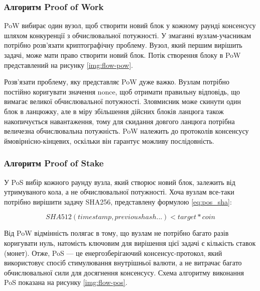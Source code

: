 \documentclass{lib/styles/default-style}
\begin{document}
    \subsubsection{Алгоритм Proof of Work}

    PoW вибирає один вузол, щоб створити новий блок у кожному раунді консенсусу шляхом конкуренції з
    обчислювальної потужності. У змаганні вузлам-учасникам потрібно розв'язати криптографічну проблему.
    Вузол, який першим вирішить задачі, може мати право створити новий блок.
    Потік створення блоку в PoW представлений на рисунку \ref{img:flow-pow}.


    Розв'язати проблему, яку представляє PoW дуже важко.
    Вузлам потрібно постійно коригувати значення nonce, щоб отримати правильну відповідь,
    що вимагає великої обчислювальної потужності.
    Зловмисник може скинути один блок в ланцюжку, але в міру збільшення дійсних блоків ланцюга
    також накопичується навантаження, тому для скидання довгого ланцюга потрібна величезна обчислювальна потужність.
    PoW належить до протоколів консенсусу ймовірнісно-кінцевих, оскільки він гарантує можливу послідовність.


    \subsubsection{Алгоритм Proof of Stake}

    У PoS вибір кожного раунду вузла, який створює новий блок, залежить від утримуваного кола, а не обчислювальної потужності.
    Хоча вузлам все-таки потрібно вирішити задачу SHA256, представлену формулою \ref{eq:pos_sha}:

    \begin{equation}
        SHA512(timestamp, previous hash...) < target*coin
        \label{eq:pos_sha}
    \end{equation}

    Від PoW відмінність полягає в тому, що вузлам не потрібно багато разів коригувати нуль,
    натомість ключовим для вирішення цієї задачі є кількість ставок (монет).
    Отже, PoS --- це енергозберігаючий консенсус-протокол, який використовує спосіб стимулювання внутрішньої валюти,
    а не витрачає багато обчислювальної сили для досягнення консенсусу.
    Схема алгоритму виконання PoS показана на рисунку \ref{img:flow-pos}.
      
\end{document}
